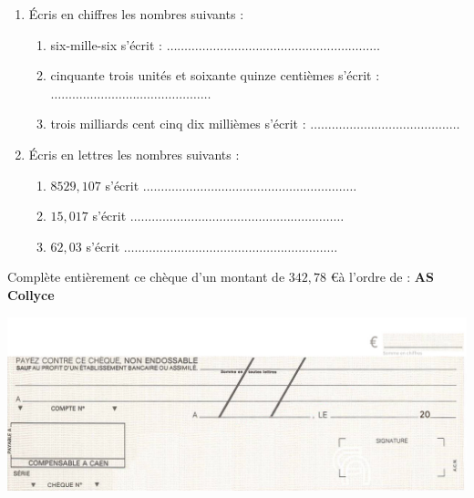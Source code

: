 \begin{pageParcourst}

 

\begin{enumerate}
\item  Écris en chiffres les nombres suivants :
\begin{enumerate}
\item six-mille-six  s'écrit  :  $\ldots\ldots\ldots\ldots\ldots\ldots\ldots\ldots\ldots\ldots\ldots\ldots\ldots\ldots\ldots\ldots\ldots\ldots\ldots\ldots$
\item cinquante trois unités et soixante quinze centièmes s'écrit :  $\ldots\ldots\ldots\ldots\ldots\ldots\ldots\ldots\ldots\ldots\ldots\ldots\ldots\ldots\ldots$
\item trois milliards cent cinq dix millièmes s'écrit :  $\ldots\ldots\ldots\ldots\ldots\ldots\ldots\ldots\ldots\ldots\ldots\ldots\ldots\ldots$
\end{enumerate}
\item  Écris en lettres les nombres suivants :
\begin{enumerate}
\item $8 529, 107$ s'écrit $\ldots\ldots\ldots\ldots\ldots\ldots\ldots\ldots\ldots\ldots\ldots\ldots\ldots\ldots\ldots\ldots\ldots\ldots\ldots\ldots$
 \item $15,017$ s'écrit $\ldots\ldots\ldots\ldots\ldots\ldots\ldots\ldots\ldots\ldots\ldots\ldots\ldots\ldots\ldots\ldots\ldots\ldots\ldots\ldots$ 
 \item $62,03$  s'écrit $\ldots\ldots\ldots\ldots\ldots\ldots\ldots\ldots\ldots\ldots\ldots\ldots\ldots\ldots\ldots\ldots\ldots\ldots\ldots\ldots$
\end{enumerate}
\end{enumerate}




Complète entièrement ce chèque d'un montant de $342,78$ \euro à l'ordre de : \textbf{AS Collyce}

 \includegraphics[scale=1]{FIG/spechequedebanque.jpg} 
 


\end{pageParcourst}
